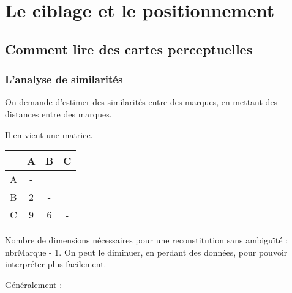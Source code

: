 
\chapter{Le ciblage et le positionnement}
	
	\section{Comment lire des cartes perceptuelles}
	
	
		\subsection{L'analyse de similarités}
		
		On demande d'estimer des similarités entre des marques, en mettant des distances entre des marques.
		
		Il en vient une matrice.
		
		\begin{center}
		\begin{tabular}{|c|c|c|c|}
			\hline  & A & B & C \\ 
			\hline A & - &  &  \\ 
			\hline B & 2 & - &  \\ 
			\hline C & 9 & 6 & - \\ 
			\hline 
		\end{tabular} 
		\end{center}
		
		Nombre de dimensions nécessaires pour une reconstitution sans ambiguïté : nbrMarque - 1. On peut le diminuer, en perdant des données, pour pouvoir interpréter plus facilement.
		
		
		Généralement :
		
